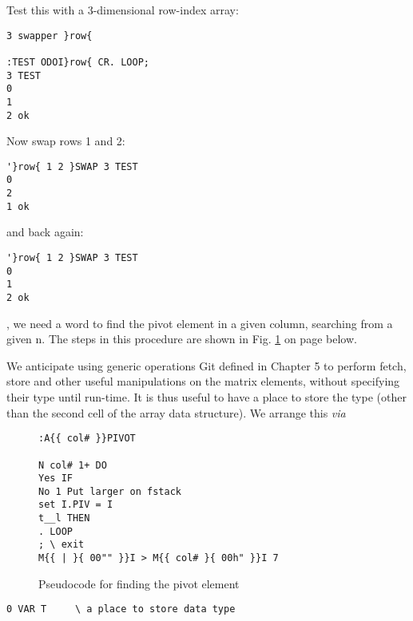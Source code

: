 Test this with a 3-dimensional row-index array:

\begin{verbatim}
3 swapper }row{

:TEST ODOI}row{ CR. LOOP;
3 TEST
0
1
2 ok
\end{verbatim}

Now swap rows 1 and 2:

\begin{verbatim}
'}row{ 1 2 }SWAP 3 TEST
0
2
1 ok
\end{verbatim}
and back again:
\begin{verbatim}
'}row{ 1 2 }SWAP 3 TEST
0
1
2 ok
\end{verbatim} 

, we need a word to find the pivot element in a given
column, searching from a given n. The steps in this procedure
are shown in Fig. \ref{fig:09_02} on page \pageref{fig:09_02} below.

We anticipate using generic operations Git defined in Chapter 5 
to perform fetch, store and other useful manipulations on the
matrix elements, without specifying their type until run-time. It
is thus useful to have a place to store the type (other than the
second cell of the array data structure). We arrange this \textit{via}

\begin{figure}
\begin{verbatim}
:A{{ col# }}PIVOT

N col# 1+ DO
Yes IF
No 1 Put larger on fstack
set I.PIV = I
t__l THEN
. LOOP
; \ exit
M{{ | }{ 00"" }}I > M{{ col# }{ 00h" }}I 7 
\end{verbatim}
    \caption{Pseudocode for finding the pivot element}
    \label{fig:09_02}
\end{figure}



\begin{verbatim}
0 VAR T     \ a place to store data type
\end{verbatim}

